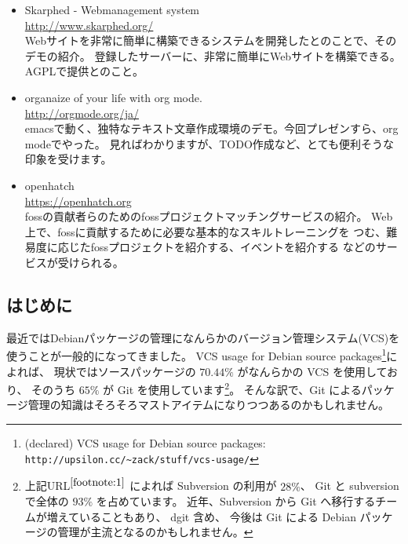 \documentclass[mingoth,a4paper]{jsarticle}
\begin{document}
\begin{itemize}
\item Skarphed - Webmanagement system\\
\url{http://www.skarphed.org/}\\
Webサイトを非常に簡単に構築できるシステムを開発したとのことで、そのデモの紹介。
登録したサーバーに、非常に簡単にWebサイトを構築できる。AGPLで提供とのこと。
\item organaize of your life with org mode.\\
\url{http://orgmode.org/ja/}\\
emacsで動く、独特なテキスト文章作成環境のデモ。今回プレゼンすら、org modeでやった。
見ればわかりますが、TODO作成など、とても便利そうな印象を受けます。
\end{itemize}

\begin{itemize}
\item openhatch\\
\url{https://openhatch.org}\\
fossの貢献者らのためのfossプロジェクトマッチングサービスの紹介。
Web上で、fossに貢献するために必要な基本的なスキルトレーニングを
つむ、難易度に応じたfossプロジェクトを紹介する、イベントを紹介する
などのサービスが受けられる。
\end{itemize}


\subsection{はじめに}

最近ではDebianパッケージの管理になんらかのバージョン管理システム(VCS)を使うことが一般的になってきました。
%
VCS usage for Debian source packages\footnote{%
  \label{footnote:1}
  (declared) VCS usage for Debian source packages:
  \texttt{http://upsilon.cc/\~{}zack/stuff/vcs-usage/}%
}によれば、
現状ではソースパッケージの $70.44\%$ がなんらかの VCS を使用しており、
そのうち $65\%$ が Git を使用しています\footnote{%
  上記URL$^{\ref{footnote:1}}$ によれば Subversion の利用が $28\%$、
  Git と subversion で全体の $93\%$ を占めています。
  近年、Subversion から Git へ移行するチームが増えていることもあり、
  dgit 含め、
  今後は Git による Debian パッケージの管理が主流となるのかもしれません。
}。
そんな訳で、Git によるパッケージ管理の知識はそろそろマストアイテムになりつつあるのかもしれません。
\end{document}
